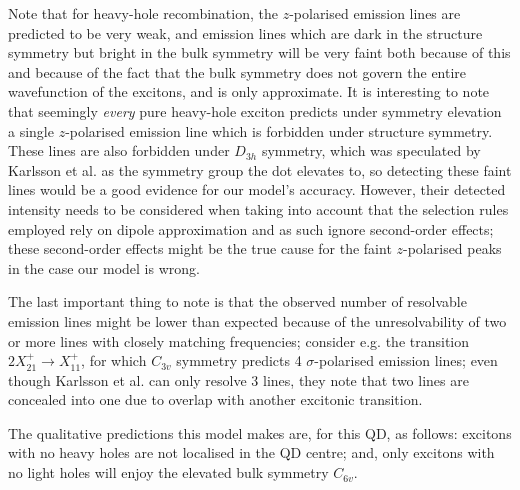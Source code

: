 \documentclass[12pt]{article}
\begin{document}
	Note that for heavy-hole recombination, the $z$-polarised emission lines are predicted to be very weak, and emission lines which are dark in the structure symmetry but bright in the bulk symmetry will be very faint both because of this and because of the fact that the bulk symmetry does not govern the entire wavefunction of the excitons, and is only approximate. It is interesting to note that seemingly \textit{every} pure heavy-hole exciton predicts under symmetry elevation a single $z$-polarised emission line which is forbidden under structure symmetry. These lines are also forbidden under $D_{3h}$ symmetry, which was speculated by Karlsson et al. as the symmetry group the dot elevates to, so detecting these faint lines would be a good evidence for our model's accuracy. However, their detected intensity needs to be considered when taking into account that the selection rules employed rely on dipole approximation and as such ignore second-order effects; these second-order effects might be the true cause for the faint $z$-polarised peaks in the case our model is wrong.
	
	The last important thing to note is that the observed number of resolvable emission lines might be lower than expected because of the unresolvability of two or more lines with closely matching frequencies; consider e.g. the transition $2X^+_{21}\to X^+_{11}$, for which $C_{3v}$ symmetry predicts 4 $\sigma$-polarised emission lines; even though Karlsson et al. can only resolve 3 lines, they note that two lines are concealed into one due to overlap with another excitonic transition.
	
	The qualitative predictions this model makes are, for this QD, as follows: excitons with no heavy holes are not localised in the QD centre; and, only excitons with no light holes will enjoy the elevated bulk symmetry $C_{6v}$.
	
	
\end{document}
